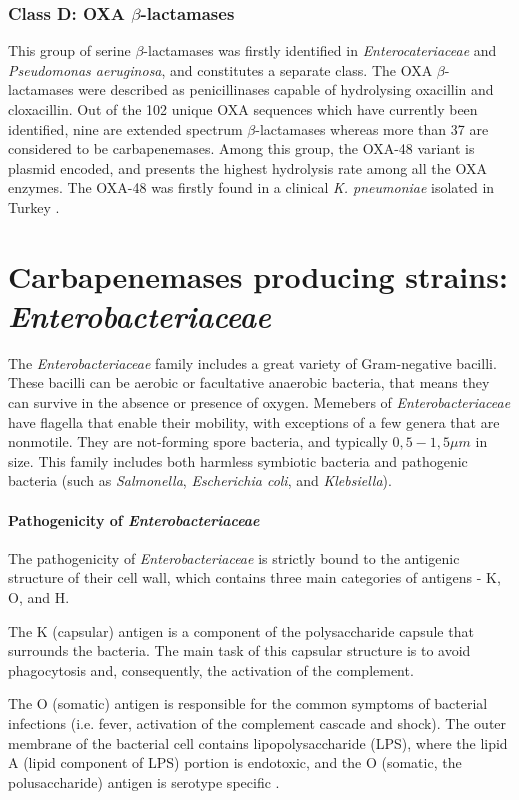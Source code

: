 \documentclass[11pt]{report}
\begin{document}
\subsection{Class D: OXA $\beta$-lactamases}
This group of serine $\beta$-lactamases was firstly identified in \emph{Enterocateriaceae} and \emph{Pseudomonas aeruginosa}, and constitutes a separate class.
The OXA $\beta$-lactamases were described as penicillinases capable of hydrolysing oxacillin and cloxacillin.
Out of the 102 unique OXA sequences which have currently been identified, nine are extended spectrum $\beta$-lactamases whereas more than 37 are considered to be carbapenemases.
Among this group, the OXA-48 variant is plasmid encoded, and presents the highest hydrolysis rate among all the OXA enzymes.
The OXA-48 was firstly found in a clinical \emph{K. pneumoniae} isolated in Turkey \cite{Poirel2012}.

\chapter{Carbapenemases producing strains: \emph{Enterobacteriaceae}}
The \emph{Enterobacteriaceae} family includes a great variety of Gram-negative bacilli.
These bacilli can be aerobic or facultative anaerobic bacteria, that means they can survive in the absence or presence of oxygen.
Memebers of \emph{Enterobacteriaceae} have flagella that enable their mobility, with exceptions of a few genera that are nonmotile.
They are not-forming spore bacteria, and typically $0,5-1,5\mu m$ in size.
This family includes both harmless symbiotic bacteria and pathogenic bacteria (such as \emph{Salmonella}, \emph{Escherichia coli}, and \emph{Klebsiella}).

\subsubsection{Pathogenicity of \emph{Enterobacteriaceae}}

The pathogenicity of \emph{Enterobacteriaceae} is strictly bound to the antigenic structure of their cell wall, which contains three main categories of antigens - K, O, and H.

The K (capsular) antigen is a component of the polysaccharide capsule that surrounds the bacteria.
The main task of this capsular structure is to avoid phagocytosis and, consequently, the activation of the complement.

The O (somatic) antigen is responsible for the common symptoms of bacterial infections (i.e. fever, activation of the complement cascade and shock).
The outer membrane of the bacterial cell contains lipopolysaccharide (LPS), where the lipid A (lipid component of LPS) portion is endotoxic, and the O (somatic, the polusaccharide) antigen is serotype specific \cite{guentzel1996escherichia}.
\end{document}
